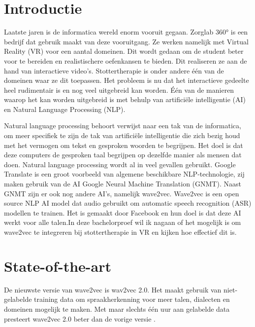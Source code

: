 
\section{Introductie}%
\label{sec:introductie}
Laatste jaren is de informatica wereld enorm vooruit gegaan. Zorglab 360° is een bedrijf dat gebruik maakt van deze vooruitgang. Ze werken namelijk met Virtual Reality (VR) voor een aantal domeinen. Dit wordt gedaan om de student beter voor te bereiden en realistischere oefenkansen te bieden. Dit realiseren ze aan de hand van interactieve video's. Stottertherapie is onder andere één van de domeinen waar ze dit toepassen. Het probleem is nu dat het interactieve gedeelte heel rudimentair is en nog veel uitgebreid kan worden. Één van de manieren waarop het kan worden uitgebreid is met behulp van artificiële intelligentie (AI) en Natural Language Processing (NLP). \par

Natural language processing behoort verwijst naar een tak van de informatica, om meer specifiek te zijn de tak van artificiële intelligentie die zich bezig houd met het vermogen om tekst en gesproken woorden te begrijpen. Het doel is dat deze computers de gesproken taal begrijpen op dezelfde manier als mensen dat doen\autocite{Education}. Natural language processing wordt al in veel gevallen gebruikt. Google Translate is een groot voorbeeld van algemene beschikbare NLP-technologie, zij maken gebruik van de AI Google Neural Machine Translation (GNMT). Naast GNMT zijn er ook nog andere AI's, namelijk wave2vec. Wave2vec is een open source NLP AI model dat audio gebruikt om automatic speech recognition (ASR) modellen te trainen. Het is gemaakt door Facebook en hun doel is dat deze AI werkt voor alle talen.In deze bachelorproef wil ik nagaan of het mogelijk is om wave2vec te integreren bij stottertherapie in VR en kijken hoe effectief dit is. 





\section{State-of-the-art}%
\label{sec:state-of-the-art}

De nieuwste versie van wave2vec is wav2vec 2.0. Het maakt gebruik van niet-gelabelde training data om spraakherkenning voor meer talen, dialecten en domeinen mogelijk te maken. Met maar slechts één uur aan gelabelde data presteert wave2vec 2.0 beter dan de vorige versie \autocite{Baevski2020}.\par 

